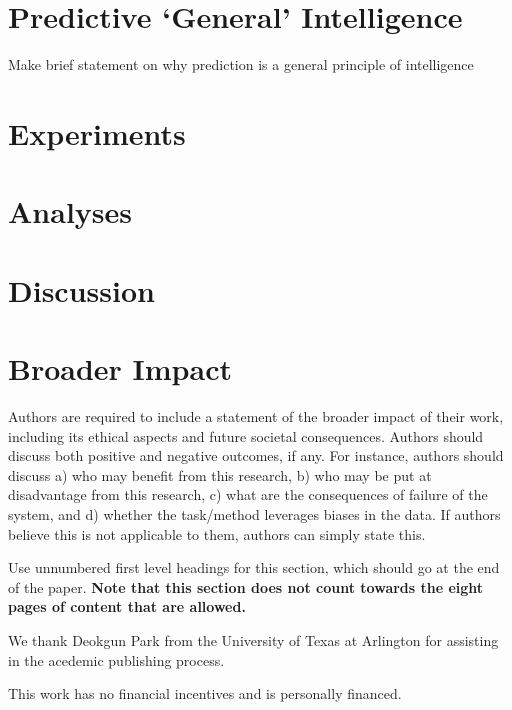 \documentclass{article}
\begin{document}
\section{Predictive ‘General’ Intelligence}

Make brief statement on why prediction is a general principle of intelligence

\section{Experiments}

\section{Analyses}

\section{Discussion}



\section*{Broader Impact}

Authors are required to include a statement of the broader impact of their work, including its ethical aspects and future societal consequences. 
Authors should discuss both positive and negative outcomes, if any. For instance, authors should discuss a) 
who may benefit from this research, b) who may be put at disadvantage from this research, c) what are the consequences of failure of the system, and d) whether the task/method leverages
biases in the data. If authors believe this is not applicable to them, authors can simply state this.

Use unnumbered first level headings for this section, which should go at the end of the paper. {\bf Note that this section does not count towards the eight pages of content that are allowed.}

\begin{ack}
We thank Deokgun Park from the University of Texas at Arlington for assisting in the acedemic publishing process. \citep[p. 130]{Ful83}

This work has no financial incentives and is personally financed.
\end{ack}

\medskip



\end{document}
